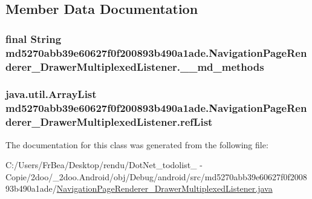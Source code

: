\subsection{Member Data Documentation}
\hypertarget{classmd5270abb39e60627f0f200893b490a1ade_1_1_navigation_page_renderer___drawer_multiplexed_listener_fbd57ba6663a7c518799ec5668b08d40}{
\subsubsection[{\_\-\_\-md\_\-methods}]{\setlength{\rightskip}{0pt plus 5cm}final String {\bf md5270abb39e60627f0f200893b490a1ade.NavigationPageRenderer\_\-DrawerMultiplexedListener.\_\-\_\-md\_\-methods}}}
\label{classmd5270abb39e60627f0f200893b490a1ade_1_1_navigation_page_renderer___drawer_multiplexed_listener_fbd57ba6663a7c518799ec5668b08d40}


\hypertarget{classmd5270abb39e60627f0f200893b490a1ade_1_1_navigation_page_renderer___drawer_multiplexed_listener_8022e4f9043b76f8c63dff3406a8d039}{
\subsubsection[{refList}]{\setlength{\rightskip}{0pt plus 5cm}java.util.ArrayList {\bf md5270abb39e60627f0f200893b490a1ade.NavigationPageRenderer\_\-DrawerMultiplexedListener.refList}}}
\label{classmd5270abb39e60627f0f200893b490a1ade_1_1_navigation_page_renderer___drawer_multiplexed_listener_8022e4f9043b76f8c63dff3406a8d039}




The documentation for this class was generated from the following file:\begin{CompactItemize}
\item 
C:/Users/FrBea/Desktop/rendu/DotNet\_\-todolist\_ - Copie/2doo/\_\-2doo.Android/obj/Debug/android/src/md5270abb39e60627f0f200893b490a1ade/\hyperlink{_navigation_page_renderer___drawer_multiplexed_listener_8java}{NavigationPageRenderer\_\-DrawerMultiplexedListener.java}\end{CompactItemize}

